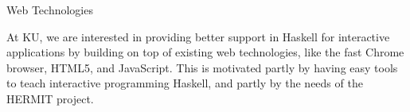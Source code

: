 \begin{hcarentry}{Web Technologies}
\label{kuwebtech}
\makeheader

At KU, we are interested in providing better support in Haskell for
interactive applications by building on top of existing web technologies,
like the fast Chrome browser, HTML5, and JavaScript. This is motivated
partly by having easy tools to teach interactive programming Haskell,
and partly by the needs of the HERMIT project.

\end{hcarentry}
